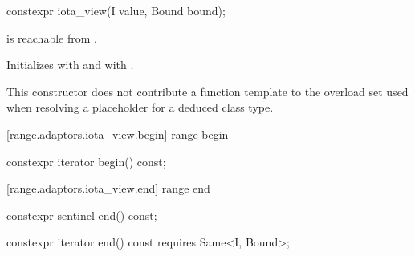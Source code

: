 %
\begin{itemdecl}
constexpr iota_view(I value, Bound bound);
\end{itemdecl}

\begin{itemdescr}
\pnum
\oldtxt{\requires} \newtxt{\expects}
 is reachable from .

\pnum
\effects Initializes  with  and  with
.

\pnum
\remarks This constructor does not contribute a function template to the overload
set used when resolving a placeholder for a deduced class
type.
\end{itemdescr}

[range.adaptors.iota_view.begin]{ range begin}

%
\begin{itemdecl}
constexpr iterator begin() const;
\end{itemdecl}

\begin{itemdescr}
\pnum
\oldtxt{\returns} 
\end{itemdescr}

[range.adaptors.iota_view.end]{ range end}

%
\begin{itemdecl}
constexpr sentinel end() const;
\end{itemdecl}

\begin{itemdescr}
\pnum
\oldtxt{\returns} 
\end{itemdescr}

%
\begin{itemdecl}
constexpr iterator end() const requires Same<I, Bound>;
\end{itemdecl}

\begin{itemdescr}
\pnum
\oldtxt{\returns} 
\end{itemdescr}

